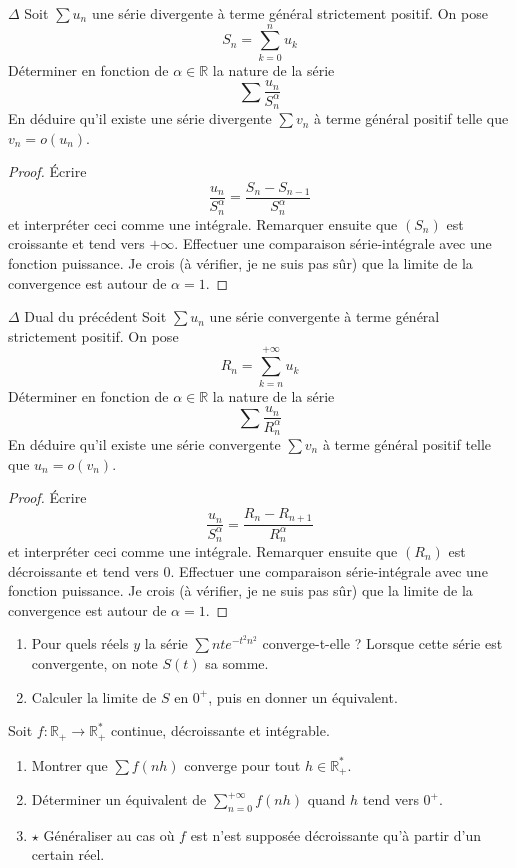 \documentclass[french,a4paper]{article}
\newcommand{\R}{\mathbb{R}}
\newcommand{\st}{^*}
\theoremstyle{plain}
\theoremstyle{definition}
\theoremstyle{remark}
\begin{document}
\begin{ex}{$\Delta$}
	Soit $\sum u_n$ une série divergente à terme général strictement positif. On pose $$S_n=\sum_{k=0}^{n}u_k$$ Déterminer en fonction de $\alpha\in\R$ la nature de la série $$\sum\frac{u_n}{S_n^\alpha}$$ En déduire qu'il existe une série divergente $\sum v_n$ à terme général positif telle que $v_n=o(u_n)$.
\end{ex}
\begin{proof}
	Écrire $$\frac{u_n}{S_n^\alpha}=\frac{S_n-S_{n-1}}{S_n^\alpha}$$ et interpréter ceci comme une intégrale. Remarquer ensuite que $(S_n)$ est croissante et tend vers $+\infty$. Effectuer une comparaison série-intégrale avec une fonction puissance. Je crois (à vérifier, je ne suis pas sûr) que la limite de la convergence est autour de $\alpha=1$.
\end{proof}

\begin{ex}{$\Delta$ Dual du précédent}
	Soit $\sum u_n$ une série convergente à terme général strictement positif. On pose $$R_n=\sum_{k=n}^{+\infty}u_k$$ Déterminer en fonction de $\alpha\in\R$ la nature de la série $$\sum\frac{u_n}{R_n^\alpha}$$ En déduire qu'il existe une série convergente $\sum v_n$ à terme général positif telle que $u_n=o(v_n)$.
\end{ex}
\begin{proof}
	Écrire $$\frac{u_n}{S_n^\alpha}=\frac{R_n-R_{n+1}}{R_n^\alpha}$$ et interpréter ceci comme une intégrale. Remarquer ensuite que $(R_n)$ est décroissante et tend vers $0$. Effectuer une comparaison série-intégrale avec une fonction puissance. Je crois (à vérifier, je ne suis pas sûr) que la limite de la convergence est autour de $\alpha=1$.
\end{proof}

\begin{ex}{}
	\begin{enumerate}
		\item Pour quels réels $y$ la série $\displaystyle\sum nte^{-t^2n^2}$ converge-t-elle ? Lorsque cette série est convergente, on note $S(t)$ sa somme.
		\item Calculer la limite de $S$ en $0^+$, puis en donner un équivalent.
	\end{enumerate}
\end{ex}

\begin{ex}{}
	Soit $f:\R_+\to\R_+\st$ continue, décroissante et intégrable.
	\begin{enumerate}
		\item Montrer que $\displaystyle\sum f(nh)$ converge pour tout $h\in\R_+\st$.
		\item Déterminer un équivalent de $\displaystyle\sum_{n=0}^{+\infty}f(nh)$ quand $h$ tend vers $0^+$.
		\item $\star$ Généraliser au cas où $f$ est n'est supposée décroissante qu'à partir d'un certain réel.
	\end{enumerate}
\end{ex}
\end{document}
